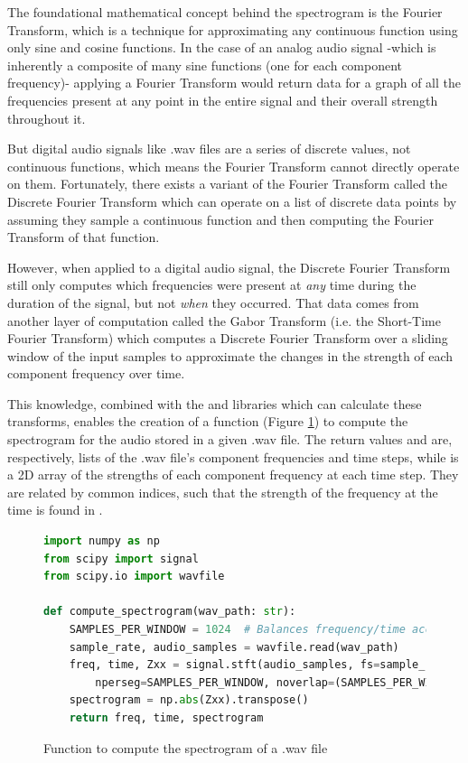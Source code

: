 The foundational mathematical concept behind the spectrogram is the Fourier Transform, which is a technique for approximating any continuous function using only sine and cosine functions.
In the case of an analog audio signal -which is inherently a composite of many sine functions (one for each component frequency)- applying a Fourier Transform would return data for a graph of all the frequencies present at any point in the entire signal and their overall strength throughout it.

But digital audio signals like .wav files are a series of discrete values, not continuous functions, which means the Fourier Transform cannot directly operate on them.
Fortunately, there exists a variant of the Fourier Transform called the Discrete Fourier Transform which can operate on a list of discrete data points by assuming they sample a continuous function and then computing the Fourier Transform of that function.

However, when applied to a digital audio signal, the Discrete Fourier Transform still only computes which frequencies were present at \emph{any} time during the duration of the signal, but not \emph{when} they occurred. 
That data comes from another layer of computation called the Gabor Transform (i.e. the Short-Time Fourier Transform) which computes a Discrete Fourier Transform over a sliding window of the input samples to approximate the changes in the strength of each component frequency over time.

This knowledge, combined with the  \cite{numpy} and  \cite{scipy} libraries which can calculate these transforms, enables the creation of a function (Figure \ref{fig:code-compute-spectrogram}) to compute the spectrogram for the audio stored in a given .wav file.
The return values  and  are, respectively, lists of the .wav file's component frequencies and time steps, while  is a 2D array of the strengths of each component frequency at each time step.
They are related by common indices, such that the strength of the frequency  at the time  is found in .

\begin{figure}[h]
\caption{Function to compute the spectrogram of a .wav file}
\label{fig:code-compute-spectrogram}
\begin{lstlisting}[language=Python]
import numpy as np
from scipy import signal
from scipy.io import wavfile

def compute_spectrogram(wav_path: str):
    SAMPLES_PER_WINDOW = 1024  # Balances frequency/time accuracy
    sample_rate, audio_samples = wavfile.read(wav_path)
    freq, time, Zxx = signal.stft(audio_samples, fs=sample_rate,
        nperseg=SAMPLES_PER_WINDOW, noverlap=(SAMPLES_PER_WINDOW // 4) * 3)
    spectrogram = np.abs(Zxx).transpose()
    return freq, time, spectrogram
\end{lstlisting}
\end{figure}

